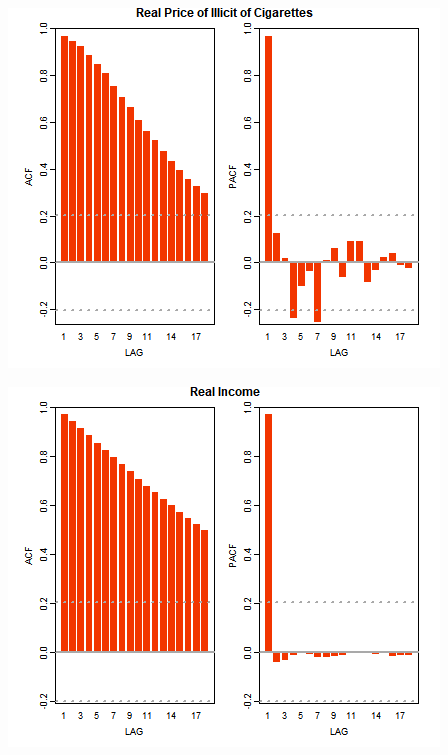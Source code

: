 \documentclass[11pt,preprint, authoryear]{elsarticle}
\let\origfigure\figure
\let\endorigfigure\endfigure
\renewenvironment{figure}[1][2] {
    \expandafter\origfigure\expandafter[H]
} {
    \endorigfigure
}
\numberwithin{equation}{section}
\numberwithin{figure}{section}
\numberwithin{table}{section}
\begin{document}
\begin{figure}[H]

{\centering \includegraphics{Thesis_files/figure-latex/Figure3-3} 

}

\caption{Autocorrelation Function Plots \label{ACF}}\label{fig:Figure3-3}
\end{figure}
\begin{figure}[H]

{\centering \includegraphics{Thesis_files/figure-latex/Figure3-4} 

}

\caption{Autocorrelation Function Plots \label{ACF}}\label{fig:Figure3-4}
\end{figure}
\end{document}
